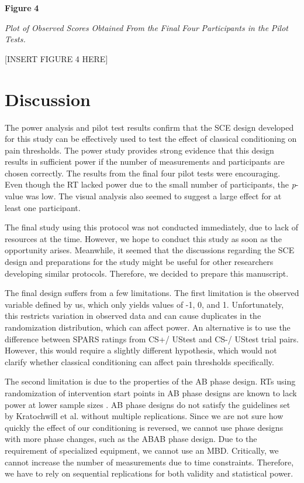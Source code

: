 \documentclass{article}
\begin{document}
\textbf{Figure }\textbf{4}

\emph{Plot of }\emph{Observed Score}\emph{s }\emph{O}\emph{btained }\emph{F}\emph{rom}\emph{ the }\emph{F}\emph{inal }\emph{F}\emph{our }\emph{P}\emph{articipants in the }\emph{P}\emph{ilot }\emph{T}\emph{ests.}

[INSERT FIGURE 4 HERE]

\section{Discussion}

The power analysis and pilot test results confirm that the SCE design developed for this study can be effectively used to test the effect of classical conditioning on pain thresholds. The power study provides strong evidence that this design results in sufficient power if the number of measurements and participants are chosen correctly. The results from the final four pilot tests were encouraging. Even though the RT lacked power due to the small number of participants, the \emph{p}-value was low. The visual analysis also seemed to suggest a large effect for at least one participant. 

The final study using this protocol was not conducted immediately, due to lack of resources at the time. However, we hope to conduct this study as soon as the opportunity arises. Meanwhile, it seemed that the discussions regarding the SCE design and preparations for the study might be useful for other researchers developing similar protocols. Therefore, we decided to prepare this manuscript.

The final design suffers from a few limitations. The first limitation is the observed variable defined by us, which only yields values of -1, 0, and 1. Unfortunately, this restricts variation in observed data and can cause duplicates in the randomization distribution, which can affect power. An alternative is to use the difference between SPARS ratings from CS+/ UStest and CS-/ UStest trial pairs. However, this would require a slightly different hypothesis, which would not clarify whether classical conditioning can affect pain thresholds specifically.

The second limitation is due to the properties of the AB phase design. RTs using randomization of intervention start points in AB phase designs are known to lack power at lower sample sizes \autocite{Michiels2019}. AB phase designs do not satisfy the guidelines set by Kratochwill et al. \autocite{Kratochwill2010} without multiple replications. Since we are not sure how quickly the effect of our conditioning is reversed, we cannot use phase designs with more phase changes, such as the ABAB phase design. Due to the requirement of specialized equipment, we cannot use an MBD. Critically, we cannot increase the number of measurements due to time constraints. Therefore, we have to rely on sequential replications for both validity and statistical power. 
\end{document}
